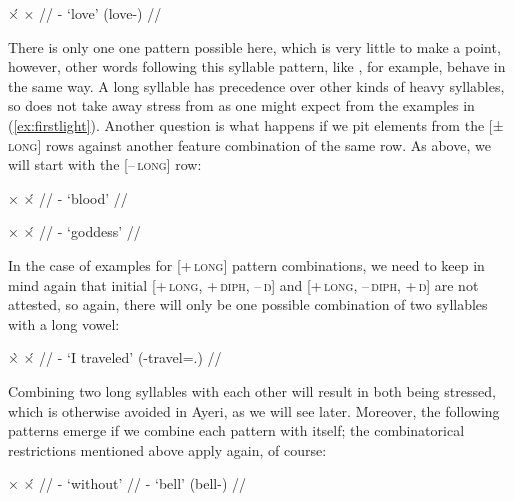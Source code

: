 \ex[everygla=\upshape]
\begingl
	\gla ×́		{}	×		{} //
	\glb {}	-		{`love' (love-\Aarg{})} //
\endgl
\xe

There is only one one pattern possible here, which is very little to make a 
point, however, other words following this syllable pattern, like 
, for example, behave in the same way. A long 
syllable has precedence over other kinds of heavy syllables, so 
 does not take away stress from  as one 
might expect from the examples in (\ref{ex:firstlight}). Another question is 
what happens if we pit elements from the \textsc{[±\,long]} rows against another 
feature combination of the same row. As above, we will start with the 
\textsc{[–\,long]} row:

\pex[everygla=\upshape]\label{-l-l}
\a\begingl
	\gla ×		{}	×́		{} //
	\glb {}	-		{`blood'} //
\endgl

\a\begingl
	\gla ×		{}	×́		{} //
	\glb {}	-		{`goddess'} //
\endgl
\xe

In the case of examples for \textsc{[+\,long]} pattern combinations, we need to 
keep in mind again that initial \textsc{[+\,long, +\,diph, –\,ŋ]} and 
\textsc{[+\,long, –\,diph, +\,ŋ]} are not attested, so again, there will only 
be one possible combination of two syllables with a long vowel:

\ex[everygla=\upshape]\label{+l+l}
\begingl
	\gla ×̀		{}	×́		{} //
	\glb {}	-		{`I traveled' 
		(\Pst{}-travel=\Fsg.\Top{})} //
\endgl
\xe

Combining two long syllables with each other will result in both being stressed,
which is otherwise avoided in Ayeri, as we will see later. Moreover, the 
following patterns emerge if we combine each pattern with itself; the 
combinatorical restrictions mentioned above apply again, of course:

\pex[everygla=\upshape]
\a\begingl
	\gla ×		{}	×́	{} //
	\glb {}	-		{`without'} //
	\glb {}	-		{`bell' (bell-\AargI{})} //
\endgl

